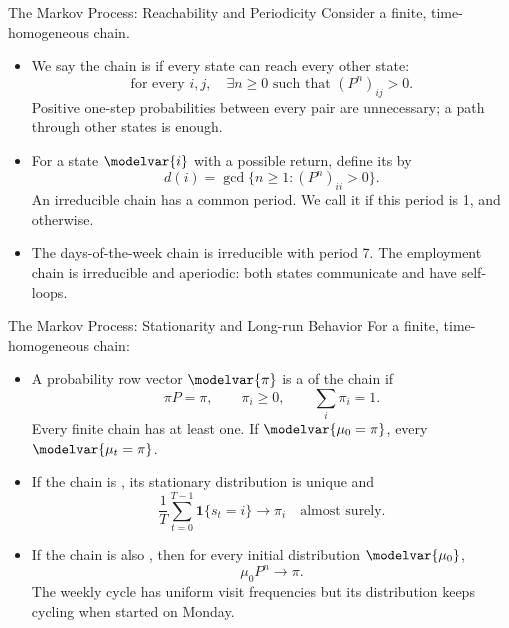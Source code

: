 \begin{frame}{The Markov Process: Reachability and Periodicity}
\small
Consider a finite, time-homogeneous chain.
\begin{itemize}
  \item We say the chain is  if every state can reach every other state:
  \[\text{for every }i,j,\quad \exists n\geq0\text{ such that }(P^n)_{ij}>0.\]
  Positive one-step probabilities between every pair are unnecessary; a path through other states is enough.
  \item For a state \(\modelvar{i}\) with a possible return, define its  by
  \[d(i)=\gcd\{n\geq1:(P^n)_{ii}>0\}.\]
  An irreducible chain has a common period. We call it  if this period is 1, and  otherwise.
  \item The days-of-the-week chain is irreducible with period 7. The employment chain is irreducible and aperiodic: both states communicate and have self-loops.
\end{itemize}
\end{frame}

\begin{frame}{The Markov Process: Stationarity and Long-run Behavior}
\small
{}
\setlength{\abovedisplayskip}{4pt}\setlength{\belowdisplayskip}{4pt}
For a finite, time-homogeneous chain:
\begin{itemize}
  \item A probability row vector \(\modelvar{\pi}\) is a  of the chain if
  \[\pi P=\pi,\qquad \pi_i\geq0,\qquad\sum_i\pi_i=1.\]
  Every finite chain has at least one. If \(\modelvar{\mu_0=\pi}\), every \(\modelvar{\mu_t=\pi}\).
  \item If the chain is , its stationary distribution is unique and
  \[\frac1T\sum_{t=0}^{T-1}\mathbf1\{s_t=i\}\longrightarrow\pi_i
    \quad\text{almost surely.}\]
  \item If the chain is also , then for every initial distribution \(\modelvar{\mu_0}\),
  \[\mu_0P^n\longrightarrow\pi.\]
  The weekly cycle has uniform visit frequencies but its distribution keeps cycling when started on Monday.
\end{itemize}
\end{frame}

